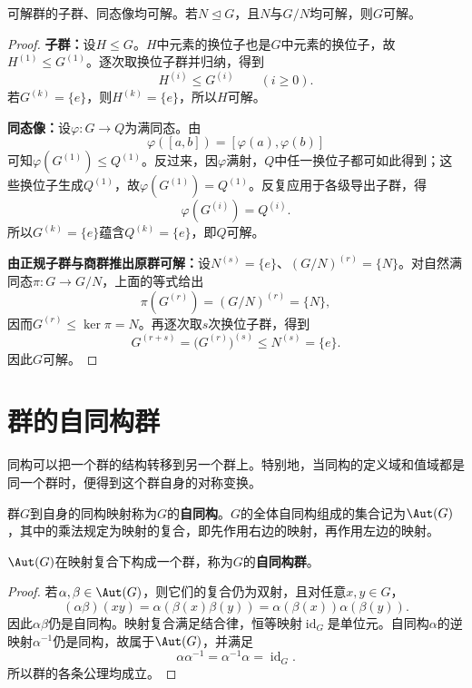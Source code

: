 \begin{proposition}\label{p2:solvable-extension}
可解群的子群、同态像均可解。若$N\trianglelefteq G$，且$N$与$G/N$均可解，则$G$可解。
\end{proposition}
\begin{proof}
\textbf{子群：}设$H\leq G$。$H$中元素的换位子也是$G$中元素的换位子，故$H^{(1)}\leq G^{(1)}$。逐次取换位子群并归纳，得到
\[
H^{(i)}\leq G^{(i)}\qquad(i\geq0).
\]
若$G^{(k)}=\{e\}$，则$H^{(k)}=\{e\}$，所以$H$可解。

\textbf{同态像：}设$\varphi:G\to Q$为满同态。由
\[
\varphi([a,b])=[\varphi(a),\varphi(b)]
\]
可知$\varphi(G^{(1)})\leq Q^{(1)}$。反过来，因$\varphi$满射，$Q$中任一换位子都可如此得到；这些换位子生成$Q^{(1)}$，故$\varphi(G^{(1)})=Q^{(1)}$。反复应用于各级导出子群，得
\[
\varphi(G^{(i)})=Q^{(i)}.
\]
所以$G^{(k)}=\{e\}$蕴含$Q^{(k)}=\{e\}$，即$Q$可解。

\textbf{由正规子群与商群推出原群可解：}设$N^{(s)}=\{e\}$、$(G/N)^{(r)}=\{N\}$。对自然满同态$\pi:G\to G/N$，上面的等式给出
\[
\pi(G^{(r)})=(G/N)^{(r)}=\{N\},
\]
因而$G^{(r)}\leq\ker\pi=N$。再逐次取$s$次换位子群，得到
\[
G^{(r+s)}=\bigl(G^{(r)}\bigr)^{(s)}\leq N^{(s)}=\{e\}.
\]
因此$G$可解。
\end{proof}


\section{群的自同构群}

同构可以把一个群的结构转移到另一个群上。特别地，当同构的定义域和值域都是同一个群时，便得到这个群自身的对称变换。

\begin{definition}
\label{p2:concept:c2-l718}群$G$到自身的同构映射称为$G$的\textbf{自同构}。$G$的全体自同构组成的集合记为$\Aut(G)$，其中的乘法规定为映射的复合，即先作用右边的映射，再作用左边的映射。
\end{definition}

\begin{proposition}
\label{p2:concept:c2-l722}$\Aut(G)$在映射复合下构成一个群，称为$G$的\textbf{自同构群}。
\end{proposition}
\begin{proof}
若$\alpha,\beta\in\Aut(G)$，则它们的复合仍为双射，且对任意$x,y\in G$，
\[
(\alpha\beta)(xy)
=\alpha(\beta(x)\beta(y))
=\alpha(\beta(x))\alpha(\beta(y)).
\]
因此$\alpha\beta$仍是自同构。映射复合满足结合律，恒等映射$\operatorname{id}_G$是单位元。自同构$\alpha$的逆映射$\alpha^{-1}$仍是同构，故属于$\Aut(G)$，并满足
\[
\alpha\alpha^{-1}=\alpha^{-1}\alpha=\operatorname{id}_G.
\]
所以群的各条公理均成立。
\end{proof}

